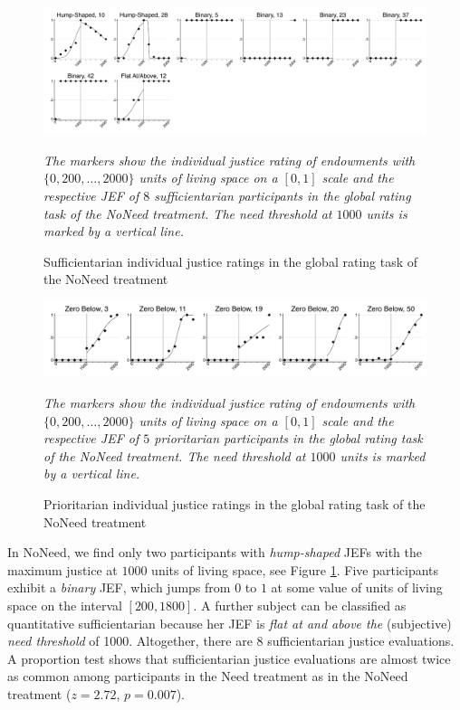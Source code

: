 \documentclass[12pt]{scrartcl}
\begin{document}
\begin{figure}[h!t!]
   \centering
   \includegraphics[width=\linewidth]{figures/figure_6.pdf}
   \begin{minipage}{\linewidth}
      \footnotesize
      \textit{The markers show the individual justice rating of endowments with $\{0,200,\ldots,2000\}$ units of living space on a $[0,1]$ scale and the respective JEF of $8$ sufficientarian participants in the global rating task of the NoNeed treatment. The need threshold at $1000$ units is marked by a vertical line.}
   \end{minipage}
   \caption{Sufficientarian individual justice ratings in the global rating task of the NoNeed treatment}\label{fig:figure_6}
\end{figure}

\begin{figure}[h!t!]
   \centering
   \includegraphics[width=11.7cm]{figures/figure_7.pdf}
   \begin{minipage}{\linewidth}
      \footnotesize
      \textit{The markers show the individual justice rating of endowments with $\{0,200,\ldots,2000\}$ units of living space on a $[0,1]$ scale and the respective JEF of $5$ prioritarian participants in the global rating task of the NoNeed treatment. The need threshold at $1000$ units is marked by a vertical line.}
   \end{minipage}
   \caption{Prioritarian individual justice ratings in the global rating task of the NoNeed treatment}\label{fig:figure_7}
\end{figure}

In NoNeed, we find only two participants with \textit{hump-shaped} JEFs with the maximum justice at $1000$ units of living space, see Figure \ref{fig:figure_6}.
Five participants exhibit a \textit{binary} JEF, which jumps from $0$ to $1$ at some value of units of living space on the interval $[200,1800]$.
A further subject can be classified as quantitative sufficientarian because her JEF is \textit{flat at and above the} (subjective) \textit{need threshold} of 1000.
Altogether, there are $8$ sufficientarian justice evaluations.
A proportion test shows that sufficientarian justice evaluations are almost twice as common among participants in the Need treatment as in the NoNeed treatment ($z=2.72$, $p=0.007$).
\end{document}
